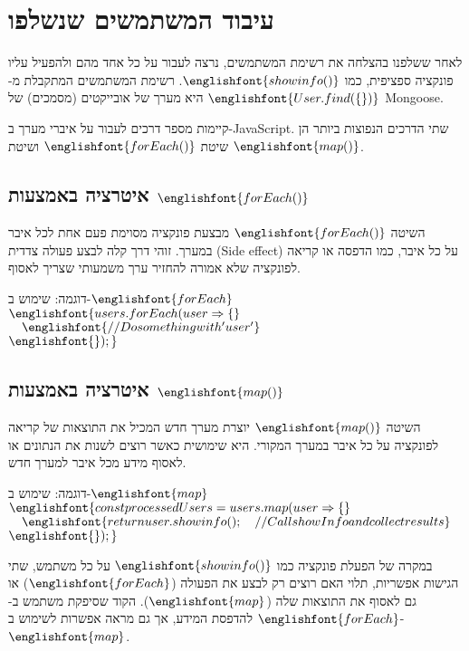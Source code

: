 \documentclass[12pt]{article}
\begin{document}
\section{עיבוד המשתמשים שנשלפו}

לאחר ששלפנו בהצלחה את רשימת המשתמשים, נרצה לעבור על כל אחד מהם ולהפעיל עליו פונקציה ספציפית, כמו \(\englishfont{showinfo()}\). רשימת המשתמשים המתקבלת מ-\(\englishfont{User.find(\{\})}\) היא מערך של אובייקטים (מסמכים) של Mongoose.

קיימות מספר דרכים לעבור על איברי מערך ב-JavaScript. שתי הדרכים הנפוצות ביותר הן שיטת \(\englishfont{forEach()}\) ושיטת \(\englishfont{map()}\).

\subsection{איטרציה באמצעות \(\englishfont{forEach()}\)}
השיטה \(\englishfont{forEach()}\) מבצעת פונקציה מסוימת פעם אחת לכל איבר במערך. זוהי דרך קלה לבצע פעולה צדדית (Side effect) על כל איבר, כמו הדפסה או קריאה לפונקציה שלא אמורה להחזיר ערך משמעותי שצריך לאסוף.

\begin{exampleBox}{דוגמה: שימוש ב-\(\englishfont{forEach}\)}
  \(\englishfont{users.forEach(user \Rightarrow \{}\)\\
  \(\quad \englishfont{// Do something with 'user'}\)\\
  \(\englishfont{\});}\)
\end{exampleBox}

\subsection{איטרציה באמצעות \(\englishfont{map()}\)}
השיטה \(\englishfont{map()}\) יוצרת מערך חדש המכיל את התוצאות של קריאה לפונקציה על כל איבר במערך המקורי. היא שימושית כאשר רוצים לשנות את הנתונים או לאסוף מידע מכל איבר למערך חדש.

\begin{exampleBox}{דוגמה: שימוש ב-\(\englishfont{map}\)}
  \(\englishfont{const processedUsers = users.map(user \Rightarrow \{}\)\\
  \(\quad \englishfont{return user.showinfo(); \quad // Call showInfo and collect results}\)\\
  \(\englishfont{\});}\)
\end{exampleBox}

במקרה של הפעלת פונקציה כמו \(\englishfont{showinfo()}\) על כל משתמש, שתי הגישות אפשריות, תלוי האם רוצים רק לבצע את הפעולה (\(\englishfont{forEach}\)) או גם לאסוף את התוצאות שלה (\(\englishfont{map}\)). הקוד שסיפקת משתמש ב-\(\englishfont{forEach}\) להדפסת המידע, אך גם מראה אפשרות לשימוש ב-\(\englishfont{map}\).
\end{document}
